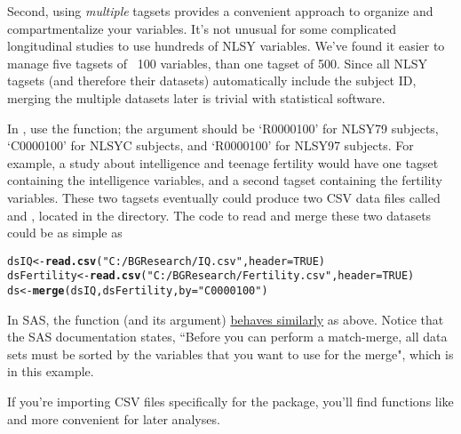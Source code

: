 \documentclass{article}\usepackage[]{graphicx}\usepackage[]{color}
\makeatletter
\newcommand{\hlnum}[1]{\textcolor[rgb]{0.686,0.059,0.569}{#1}}%
\newcommand{\hlstr}[1]{\textcolor[rgb]{0.192,0.494,0.8}{#1}}%
\newcommand{\hlstd}[1]{\textcolor[rgb]{0.345,0.345,0.345}{#1}}%
\newcommand{\hlkwb}[1]{\textcolor[rgb]{0.69,0.353,0.396}{#1}}%
\newcommand{\hlkwc}[1]{\textcolor[rgb]{0.333,0.667,0.333}{#1}}%
\newcommand{\hlkwd}[1]{\textcolor[rgb]{0.737,0.353,0.396}{\textbf{#1}}}%
\newenvironment{kframe}{%
 \def\at@end@of@kframe{}%
 \ifinner\ifhmode%
  \def\at@end@of@kframe{\end{minipage}}%
  \begin{minipage}{\columnwidth}%
 \fi\fi%
 \def\FrameCommand##1{\hskip\@totalleftmargin \hskip-\fboxsep
 \colorbox{shadecolor}{##1}\hskip-\fboxsep
     \hskip-\linewidth \hskip-\@totalleftmargin \hskip\columnwidth}%
 \MakeFramed {\advance\hsize-\width
   \@totalleftmargin\z@ \linewidth\hsize
   \@setminipage}}%
 {\par\unskip\endMakeFramed%
 \at@end@of@kframe}
\newenvironment{knitrout}{}{} %
\makeatother
\begin{document}
Second, using \emph{multiple} tagsets provides a convenient approach to organize and compartmentalize your variables.  It's not unusual for some complicated longitudinal studies to use hundreds of NLSY variables.  We've found it easier to manage five tagsets of ~100 variables, than one tagset of 500.  Since all NLSY tagsets (and therefore their datasets) automatically include the subject ID, merging the multiple datasets later is trivial with statistical software. 

In \R{}, use the  function; the  argument should be `R0000100' for NLSY79 subjects,  `C0000100' for NLSYC subjects, and `R0000100' for NLSY97 subjects.  For example, a study about intelligence and teenage fertility would have one tagset containing the intelligence variables, and a second tagset containing the fertility variables.  These two tagsets eventually could produce two CSV data files called  and , located in the  directory.  The \R{} code to read and merge these two datasets could be as simple as

\begin{knitrout}
\color{fgcolor}\begin{kframe}
\begin{alltt}
\hlstd{dsIQ} \hlkwb{<-} \hlkwd{read.csv}\hlstd{(}\hlstr{"C:/BGResearch/IQ.csv"}\hlstd{,} \hlkwc{header} \hlstd{=} \hlnum{TRUE}\hlstd{)}
\hlstd{dsFertility} \hlkwb{<-} \hlkwd{read.csv}\hlstd{(}\hlstr{"C:/BGResearch/Fertility.csv"}\hlstd{,} \hlkwc{header} \hlstd{=} \hlnum{TRUE}\hlstd{)}
\hlstd{ds} \hlkwb{<-} \hlkwd{merge}\hlstd{(dsIQ, dsFertility,} \hlkwc{by} \hlstd{=} \hlstr{"C0000100"}\hlstd{)}
\end{alltt}
\end{kframe}
\end{knitrout}


In SAS, the  function (and its  argument) \href{http://support.sas.com/documentation/cdl/en/basess/58133/HTML/default/viewer.htm#a001318494.htm}{behaves similarly} as above.  Notice that the SAS documentation states, ``Before you can perform a match-merge, all data sets must be sorted by the variables that you want to use for the merge", which is  in this example.

If you're importing CSV files specifically for the  package, you'll find functions like  and  more convenient for later analyses.
\end{document}
